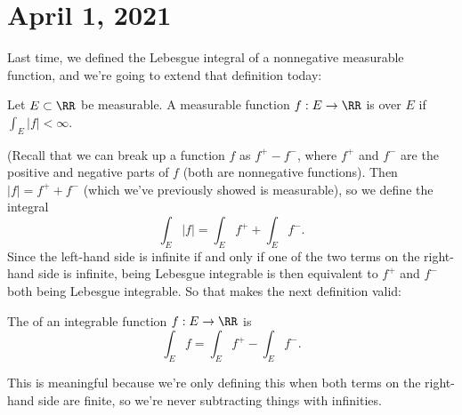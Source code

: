 
\pagebreak\section*{April 1, 2021}

Last time, we defined the Lebesgue integral of a nonnegative measurable function, and we're going to extend that definition today:

\begin{definition}
Let $E \subset \RR$ be measurable. A measurable function $f: E \to \RR$ is  over $E$ if $\int_E |f| < \infty$.
\end{definition}

(Recall that we can break up a function $f$ as $f^+ - f^-$, where $f^+$ and $f^-$ are the positive and negative parts of $f$ (both are nonnegative functions). Then $|f| = f^+ + f^-$ (which we've previously showed is measurable), so we define the integral
\[
    \int_E |f| = \int_E f^+ + \int_E f^-. 
\]
Since the left-hand side is infinite if and only if one of the two terms on the right-hand side is infinite, being Lebesgue integrable is then equivalent to $f^+$ and $f^-$ both being Lebesgue integrable. So that makes the next definition valid:

\begin{definition}
The  of an integrable function $f: E \to \RR$ is 
\[
    \int_E f = \int_E f^+ - \int_E f^-.
\]
\end{definition}

This is meaningful because we're only defining this when both terms on the right-hand side are finite, so we're never subtracting things with infinities. 

